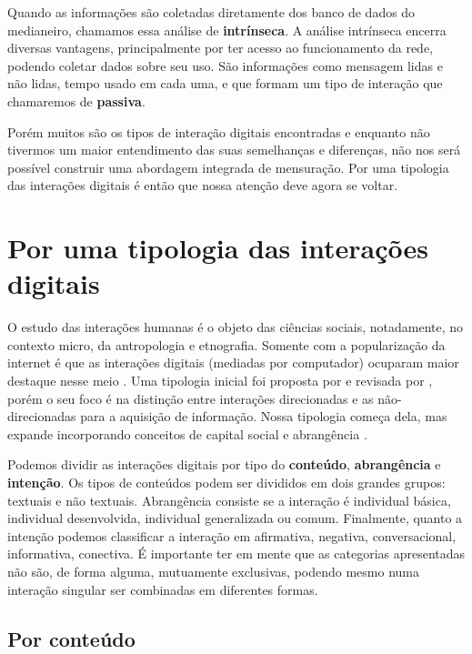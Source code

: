 Quando as informações são coletadas diretamente dos banco de dados do
medianeiro, chamamos essa análise de \textbf{intrínseca}. A análise intrínseca
encerra diversas vantagens, principalmente por ter acesso ao funcionamento da
rede, podendo coletar dados sobre seu uso. São informações como mensagem lidas e
não lidas, tempo usado em cada uma, e que formam um tipo de interação que
chamaremos de \textbf{passiva}.

Porém muitos são os tipos de interação digitais encontradas e enquanto não
tivermos um maior entendimento das suas semelhanças e diferenças, não nos será
possível construir uma abordagem integrada de mensuração. Por uma tipologia das
interações digitais é então que nossa atenção deve agora se voltar.

\section{Por uma tipologia das interações digitais}
\label{sec:tipologia}
O estudo das interações humanas é o objeto das ciências sociais, notadamente, no
contexto micro, da antropologia e etnografia. Somente com a popularização da
internet é que as interações digitais (mediadas por computador) ocuparam maior
destaque nesse meio \citep{Wellman1996, Herring2002}. Uma tipologia inicial
foi proposta por \citet{Burnett2000} e revisada por \citet{Burnett2004}, porém o
seu foco é na distinção entre interações direcionadas e as não-direcionadas para
a aquisição de informação. Nossa tipologia começa dela, mas expande incorporando
conceitos de capital social \citep{Recuero2008} e abrangência
\citep{MARTINEZ2000}.

Podemos dividir as interações digitais por tipo do \textbf{conteúdo},
\textbf{abrangência} e \textbf{intenção}. Os tipos de conteúdos podem ser
divididos em dois grandes grupos: textuais e não textuais. Abrangência consiste
se a interação é individual básica, individual desenvolvida, individual
generalizada ou comum. Finalmente, quanto a intenção podemos classificar a
interação em afirmativa, negativa, conversacional, informativa, conectiva. É
importante ter em mente que as categorias apresentadas não são, de forma alguma,
mutuamente exclusivas, podendo mesmo numa interação singular ser combinadas em
diferentes formas.

\subsection{Por conteúdo}


